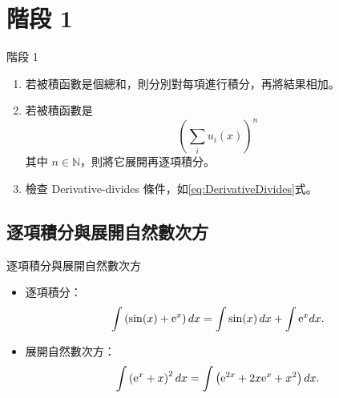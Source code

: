 \documentclass{beamer}
\newcommand{\e}{\textup e}
\newcommand{\N}{\mathbb N}
\theoremstyle{remark}
\begin{document}
\section{階段 1}
\begin{frame}{階段 1}
  \begin{enumerate}
    \item 若被積函數是個總和，則分別對每項進行積分，再將結果相加。
    \item 若被積函數是
      \[\left( \sum_i u_i(x) \right)^n\]
      其中 $n \in \N$，則將它展開再逐項積分。
    \item 檢查 Derivative-divides 條件，如\eqref{eq:DerivativeDivides}式。
  \end{enumerate}
\end{frame}

\subsection[逐項積分]{逐項積分與展開自然數次方}
\begin{frame}{逐項積分與展開自然數次方}
  \begin{itemize}
    \item 逐項積分：
      \[\int \left( \sin(x) + \e^x \right) dx = \int \sin(x)\,dx + \int \e^x dx.\]
    \item 展開自然數次方：
      \[\int \left( \e^x + x \right)^2 dx = \int \left( \e^{2x} + 2x\e^x + x^2 \right) dx.\]
  \end{itemize}
\end{frame}
\end{document}
